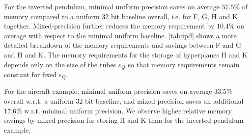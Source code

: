 

For the inverted pendulum, minimal uniform precision saves on average $57.5\%$ of memory
compared to a uniform 32 bit baseline overall, i.e. for F, G, H and K together. 
Mixed-precision further reduces the memory
requirement by $10.4\%$ on average with respect to the minimal uniform baseline. 
\autoref{tab:ipd} shows a more detailed breakdown of the memory requirements and savings
between F and G and H and K.
The memory requirements for the storage of hyperplanes H and K depends only on
the size of the tubes $\varepsilon_Q$ so that memory requirements remain constant
for fixed $\varepsilon_Q$.

For the aircraft example, minimal uniform precision saves on average $33.5\%$
overall w.r.t. a uniform 32 bit baseline, and mixed-precision saves an
additional $17.6\%$ w.r.t. minimal uniform precision. We observe higher relative
memory savings by mixed-precision for storing H and K than for the inverted pendulum example.

